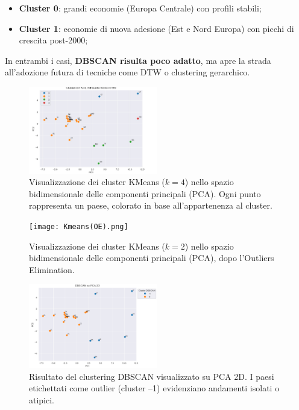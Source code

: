 \documentclass[conference]{IEEEtran}
\begin{document}
\begin{itemize}
  \item \textbf{Cluster 0}: grandi economie (Europa Centrale) con profili stabili;
  \item \textbf{Cluster 1}: economie di nuova adesione (Est e Nord Europa) con picchi di crescita post-2000;
\end{itemize}

In entrambi i casi, \textbf{DBSCAN risulta poco adatto}, ma apre la strada all’adozione futura di tecniche come DTW o clustering gerarchico.

\begin{figure}[H]
\centering
\includegraphics[width=0.5\textwidth]{Kmeans.png}
\caption{Visualizzazione dei cluster KMeans ($k=4$) nello spazio bidimensionale delle componenti principali (PCA). Ogni punto rappresenta un paese, colorato in base all’appartenenza al cluster.}
\label{fig:kmeans-cluster-map}
\end{figure}

\begin{figure}[H]
\centering
\texttt{[image: Kmeans(OE).png]}
\caption{Visualizzazione dei cluster KMeans ($k=2$) nello spazio bidimensionale delle componenti principali (PCA), dopo l'Outliers Elimination.}
\label{fig:kmeans-cluster-map}
\end{figure}

\begin{figure}[H]
\centering
\includegraphics[width=0.5\textwidth]{DBSCAN.png}
\caption{Risultato del clustering DBSCAN visualizzato su PCA 2D. I paesi etichettati come outlier (cluster –1) evidenziano andamenti isolati o atipici.}
\label{fig:dbscan-pca}
\end{figure}
\end{document}
